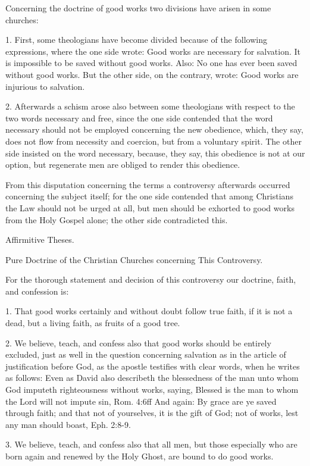 Concerning the doctrine of good works two divisions have arisen in some churches:

1. First, some theologians have become divided because of the following expressions, where the one side wrote: Good works are necessary for salvation. It is impossible to be saved without good works. Also: No one has ever been saved without good works. But the other side, on the contrary, wrote: Good works are injurious to salvation.

2. Afterwards a schism arose also between some theologians with respect to the two words necessary and free, since the one side contended that the word necessary should not be employed concerning the new obedience, which, they say, does not flow from necessity and coercion, but from a voluntary spirit. The other side insisted on the word necessary, because, they say, this obedience is not at our option, but regenerate men are obliged to render this obedience.

From this disputation concerning the terms a controversy afterwards occurred concerning the subject itself; for the one side contended that among Christians the Law should not be urged at all, but men should be exhorted to good works from the Holy Gospel alone; the other side contradicted this.

Affirmitive Theses.

Pure Doctrine of the Christian Churches concerning This Controversy.

For the thorough statement and decision of this controversy our doctrine, faith, and confession is:

1. That good works certainly and without doubt follow true faith, if it is not a dead, but a living faith, as fruits of a good tree.

2. We believe, teach, and confess also that good works should be entirely excluded, just as well in the question concerning salvation as in the article of justification before God, as the apostle testifies with clear words, when he writes as follows: Even as David also describeth the blessedness of the man unto whom God imputeth righteousness without works, saying, Blessed is the man to whom the Lord will not impute sin, Rom. 4:6ff And again: By grace are ye saved through faith; and that not of yourselves, it is the gift of God; not of works, lest any man should boast, Eph. 2:8-9.

3. We believe, teach, and confess also that all men, but those especially who are born again and renewed by the Holy Ghost, are bound to do good works.

